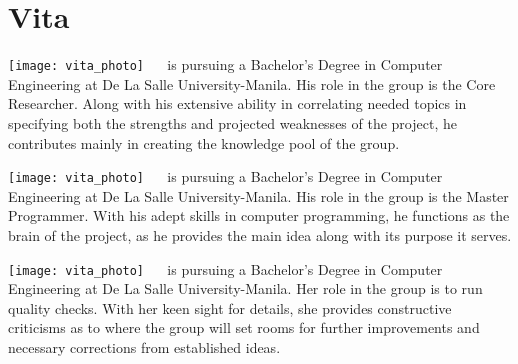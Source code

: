 \chapter{Vita}

\texttt{[image: vita\_photo]}
 \  \ is pursuing a Bachelor's Degree in Computer Engineering at De La Salle University-Manila. His role in the group is the Core Researcher. Along with his extensive ability in correlating needed topics in specifying both the strengths and projected weaknesses of the project, he contributes mainly in creating the knowledge pool of the group.

\texttt{[image: vita\_photo]}
 \  \ is pursuing a Bachelor's Degree in Computer Engineering at De La Salle University-Manila. His role in the group is the Master Programmer. With his adept skills in computer programming, he functions as the brain of the project, as he provides the main idea along with its purpose it serves.

\texttt{[image: vita\_photo]}
 \  \ is pursuing a Bachelor's Degree in Computer Engineering at De La Salle University-Manila. Her role in the group is to run quality checks. With her keen sight for details, she provides constructive criticisms as to where the group will set rooms for further improvements and necessary corrections from established ideas.

\vfill
